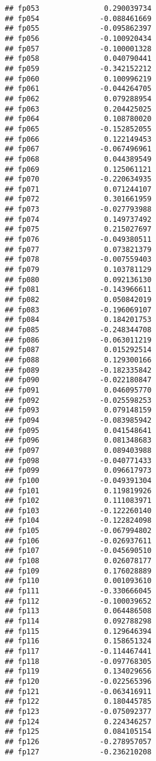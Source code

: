 \documentclass[]{article}
\begin{document}
\begin{verbatim}
## fp053               0.290039734
## fp054              -0.088461669
## fp055              -0.095862397
## fp056              -0.100920434
## fp057              -0.100001328
## fp058               0.040790441
## fp059              -0.342152212
## fp060               0.100996219
## fp061              -0.044264705
## fp062               0.079288954
## fp063               0.204425025
## fp064               0.108780020
## fp065              -0.152852055
## fp066               0.122149453
## fp067              -0.067496961
## fp068               0.044389549
## fp069               0.125061121
## fp070              -0.220634935
## fp071               0.071244107
## fp072               0.301661959
## fp073              -0.027793988
## fp074               0.149737492
## fp075               0.215027697
## fp076              -0.049380511
## fp077               0.073821379
## fp078              -0.007559403
## fp079               0.103781129
## fp080               0.092136130
## fp081              -0.143966611
## fp082               0.050842019
## fp083              -0.196069107
## fp084               0.184201753
## fp085              -0.248344708
## fp086              -0.063011219
## fp087               0.015292514
## fp088               0.129300166
## fp089              -0.182335842
## fp090              -0.022180847
## fp091               0.046095770
## fp092              -0.025598253
## fp093               0.079148159
## fp094              -0.083985942
## fp095               0.041548641
## fp096               0.081348683
## fp097               0.089403988
## fp098              -0.040771433
## fp099               0.096617973
## fp100              -0.049391304
## fp101               0.119819926
## fp102               0.111083971
## fp103              -0.122260140
## fp104              -0.122824098
## fp105              -0.067994802
## fp106              -0.026937611
## fp107              -0.045690510
## fp108               0.026078177
## fp109               0.176028889
## fp110               0.001093610
## fp111              -0.330666045
## fp112              -0.100039652
## fp113               0.064486508
## fp114               0.092788298
## fp115               0.129646394
## fp116               0.158651324
## fp117              -0.114467441
## fp118              -0.097768305
## fp119               0.134029656
## fp120              -0.022565396
## fp121              -0.063416911
## fp122               0.180445785
## fp123              -0.075092377
## fp124               0.224346257
## fp125               0.084105154
## fp126              -0.278957057
## fp127              -0.236210208

\end{verbatim}
\end{document}
